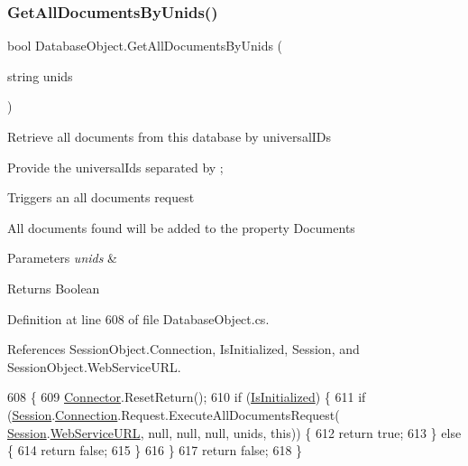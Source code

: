 \subsubsection{\texorpdfstring{Get\+All\+Documents\+By\+Unids()}{GetAllDocumentsByUnids()}\hspace{0.1cm}{\footnotesize\ttfamily [1/2]}}
{\footnotesize\ttfamily bool Database\+Object.\+Get\+All\+Documents\+By\+Unids (\begin{DoxyParamCaption}\item[{string}]{unids }\end{DoxyParamCaption})}



Retrieve all documents from this database by universal\+I\+Ds 

Provide the universal\+Ids separated by ;

Triggers an all documents request

All documents found will be added to the property \textquotesingle{}Documents\textquotesingle{}


\begin{DoxyParams}{Parameters}
{\em unids} & \\
\hline
\end{DoxyParams}
\begin{DoxyReturn}{Returns}
Boolean
\end{DoxyReturn}


Definition at line 608 of file Database\+Object.\+cs.



References Session\+Object.\+Connection, Is\+Initialized, Session, and Session\+Object.\+Web\+Service\+U\+RL.


\begin{DoxyCode}
608                                                      \{
609         \mbox{\hyperlink{class_connector}{Connector}}.ResetReturn();
610         \textcolor{keywordflow}{if} (\mbox{\hyperlink{class_database_object_a5fe036d32a30eb10d1b3f6a30263f740}{IsInitialized}}) \{
611             \textcolor{keywordflow}{if} (\mbox{\hyperlink{class_database_object_aa8484162b7d2a7c4c9426bca13c64c07}{Session}}.\mbox{\hyperlink{class_session_object_a014bdbf705a753540e19bfb53030c55c}{Connection}}.Request.ExecuteAllDocumentsRequest(
      \mbox{\hyperlink{class_database_object_aa8484162b7d2a7c4c9426bca13c64c07}{Session}}.\mbox{\hyperlink{class_session_object_a697c071c812fbf7ad1166b896fb44c16}{WebServiceURL}}, null, null, null, unids, \textcolor{keyword}{this})) \{
612                 \textcolor{keywordflow}{return} \textcolor{keyword}{true};
613             \} \textcolor{keywordflow}{else} \{
614                 \textcolor{keywordflow}{return} \textcolor{keyword}{false};
615             \}
616         \}
617         \textcolor{keywordflow}{return} \textcolor{keyword}{false};
618     \}
\end{DoxyCode}
\mbox{\label{class_database_object_a92e80ea30e83cddf47f29d0f502b81c5}} 
